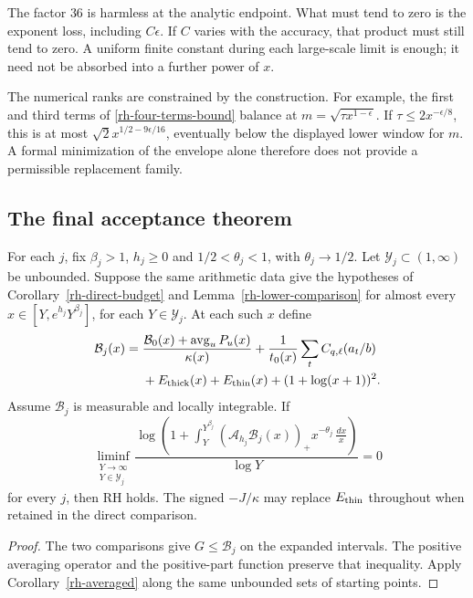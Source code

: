 The factor $36$ is harmless at the analytic endpoint. What must
tend to zero is the exponent loss, including $C\epsilon$.
If $C$ varies with the accuracy, that product must still tend to
zero. A uniform finite constant during each large-scale limit is
enough; it need not be absorbed into a further power of $x$.

The numerical ranks are constrained by the construction. For example,
the first and third terms of \eqref{rh-four-terms-bound} balance at
$m=\sqrt{\tau x^{1-\epsilon}}$. If
$\tau\le2x^{-\epsilon/8}$, this is at most
$\sqrt2x^{1/2-9\epsilon/16}$, eventually below the displayed lower
window for $m$. A formal minimization of the envelope alone therefore
does not provide a permissible replacement family.

\subsection{The final acceptance theorem}

\begin{theorem}
\label{rh-final}
For each $j$, fix $\beta_j>1$, $h_j\ge0$ and
$1/2<\theta_j<1$, with $\theta_j\to1/2$. Let
$\mathcal Y_j\subset(1,\infty)$ be unbounded.
Suppose the same arithmetic data give the hypotheses of
Corollary~\ref{rh-direct-budget} and Lemma~\ref{rh-lower-comparison}
for almost every $x\in[Y,e^{h_j}Y^{\beta_j}]$, for each
$Y\in\mathcal Y_j$. At each such $x$ define
\begin{equation}\label{rh-final-budget}
 \begin{split}
 \mathcal B_j(x)={}&
 \frac{\mathcal B_0(x)+\operatorname{avg}_uP_u(x)}{\kappa(x)}
 +\frac1{t_0(x)}\sum_tC_{q,\ell}(a_t/b)\\
 &+E_{\rm thick}(x)+E_{\rm thin}(x)+(1+\log(x+1))^2.
 \end{split}
\end{equation}
Assume $\mathcal B_j$ is measurable and locally integrable. If
\[
 \liminf_{\substack{Y\to\infty\\Y\in\mathcal Y_j}}
 \frac{\log\left(1+\displaystyle\int_Y^{Y^{\beta_j}}
    (\mathcal A_{h_j}\mathcal B_j(x))_+
                       x^{-\theta_j}\,\frac{dx}{x}\right)}{\log Y}=0
\]
for every $j$, then RH holds. The signed $-J/\kappa$ may replace
$E_{\rm thin}$ throughout when retained in the direct comparison.
\end{theorem}

\begin{proof}
The two comparisons give $G\le\mathcal B_j$ on the expanded
intervals. The positive averaging operator and the positive-part
function preserve that inequality. Apply Corollary~\ref{rh-averaged}
along the same unbounded sets of starting points.
\end{proof}

